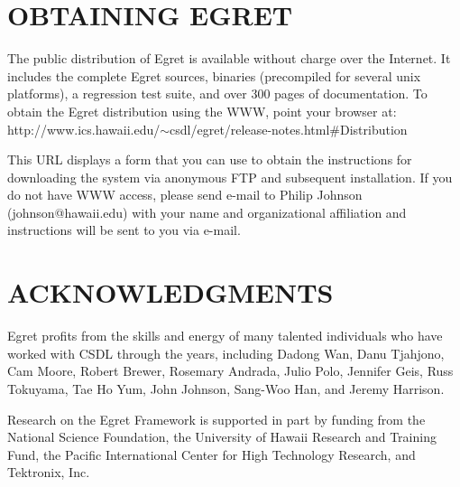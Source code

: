 \section{OBTAINING EGRET}

The public distribution of Egret is available without charge over the
Internet.  It includes the complete Egret sources, binaries (precompiled
for several unix platforms), a regression test suite, and over 300 pages of
documentation.  To obtain the Egret distribution using the WWW, point
your browser at: \newline
\small
http://www.ics.hawaii.edu/$\sim$csdl/egret/release-notes.html\#Distribution
\normalsize

This URL displays a form that you can use to obtain the instructions
for downloading the system via anonymous FTP and subsequent installation. 
If you do not have WWW access, please send e-mail to Philip Johnson
(johnson@hawaii.edu) with your name and organizational affiliation and
instructions will be sent to you via e-mail. 

\section{ACKNOWLEDGMENTS}

Egret profits from the skills and energy of many talented individuals who
have worked with CSDL through the years, including Dadong Wan, Danu
Tjahjono, Cam Moore, Robert Brewer, Rosemary Andrada, Julio Polo, Jennifer
Geis, Russ Tokuyama, Tae Ho Yum, John Johnson, Sang-Woo Han, and Jeremy
Harrison.

Research on the Egret Framework is supported in part by funding from the
National Science Foundation, the University of Hawaii Research and Training
Fund, the Pacific International Center for High Technology Research, and
Tektronix, Inc.









